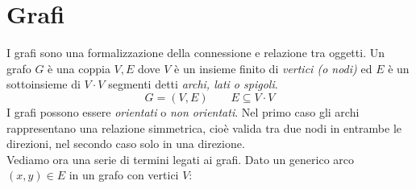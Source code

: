 \section{Grafi}
I grafi sono una formalizzazione della connessione e relazione tra oggetti.
Un grafo $G$ è una coppia $V,E$ dove $V$ è un insieme finito di \emph{vertici (o nodi)}
ed $E$ è un sottoinsieme di $V \cdot V$ segmenti detti \emph{archi, lati o spigoli}.
\begin{equation*}
    G = (V, E) \quad \quad E \subseteq V \cdot V
\end{equation*}
I grafi possono essere \emph{orientati} o \emph{non orientati}. Nel primo caso
gli archi rappresentano una relazione simmetrica, cioè valida tra due nodi in entrambe
le direzioni, nel secondo caso solo in una direzione.\\
Vediamo ora una serie di termini legati ai grafi.
Dato un generico arco $(x, y) \in E$ in un grafo con vertici $V$:
